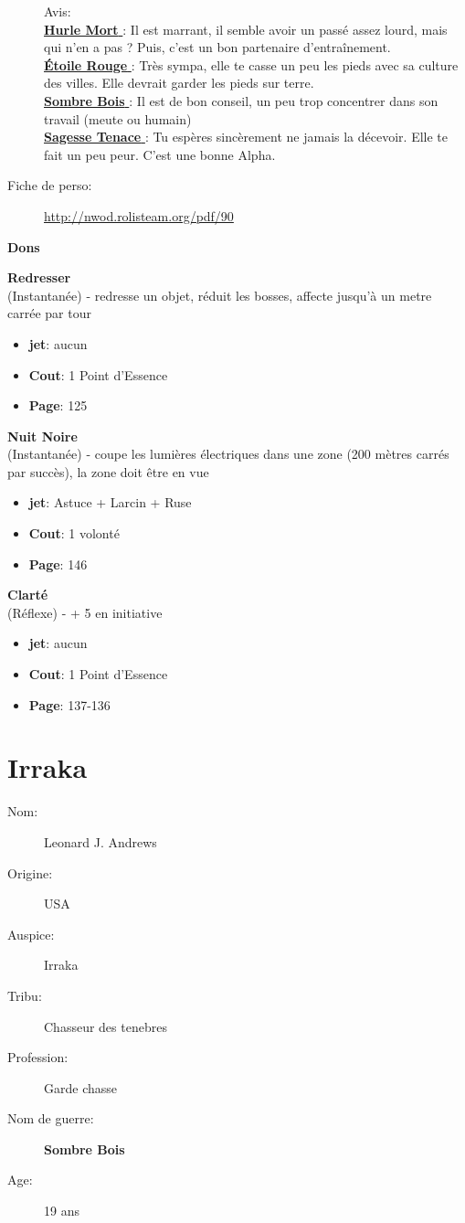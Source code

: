 \documentclass[oneside,12pt]{book}
\newcommand\don[6]{
\textbf{#1} \\
(#6) - #2
\begin{itemize}
\item{ \textbf{jet}: #3}
\item{ \textbf{Cout}: #4}
\item{ \textbf{Page}: #5}
\end{itemize}
\vspace{0.5cm}
}
\newcommand{\Lynn}{\textbf{Étoile Rouge} }
\newcommand{\Jessica}{\textbf{Sagesse Tenace} }
\newcommand{\Peter}{\textbf{Hurle Mort} }
\newcommand{\Leonard}{\textbf{Sombre Bois} }
\begin{document}
\begin{flushleft}
\begin{description}
{Avis:\\
\underline{\Peter} : Il est marrant, il semble avoir un passé assez lourd, mais qui n'en a pas ? Puis, c'est un bon partenaire d’entraînement. \\
\underline{\Lynn}: Très sympa, elle te casse un peu les pieds avec sa culture des villes. Elle devrait garder les pieds sur terre.\\
\underline{\Leonard} : Il est de bon conseil, un peu trop concentrer dans son travail (meute ou humain)\\
\underline{\Jessica}: Tu espères sincèrement ne jamais la décevoir. Elle te fait un peu peur. C'est une bonne Alpha.\\
}
\item[Fiche de perso:]{\href{http://nwod.rolisteam.org/pdf/90}{http://nwod.rolisteam.org/pdf/90}}
\end{description}
\clearpage
\textbf{\large Dons} 
\vspace{0.5cm}


\don{Redresser}{redresse un objet, réduit les bosses, affecte jusqu'à un metre carrée par tour}{aucun}{1 Point d'Essence}{125}{Instantanée}
\don{Nuit Noire}{coupe les lumières électriques dans une zone (200 mètres carrés par succès), la zone doit être en vue}{Astuce + Larcin + Ruse}{1 volonté}{146}{Instantanée}
\don{Clarté}{+ 5 en initiative}{aucun}{1 Point d'Essence}{137-136}{Réflexe}

\clearpage
\section{Irraka}
\begin{description}
\item[Nom:]{Leonard J. Andrews}
\item[Origine:]{USA}
\item[Auspice:]{Irraka}
\item[Tribu:]{Chasseur des tenebres}
\item[Profession:]{Garde chasse}
\item[Nom de guerre:]{\Leonard}
\item[Age:]{19 ans}


\end{description}
\end{flushleft}
\end{document}
